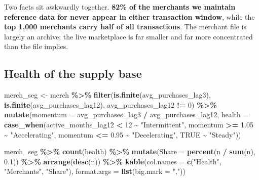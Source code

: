 \documentclass[
]{article}
\newenvironment{Shaded}{\begin{snugshade}}{\end{snugshade}}
\newcommand{\AttributeTok}[1]{\textcolor[rgb]{0.13,0.29,0.53}{#1}}
\newcommand{\ConstantTok}[1]{\textcolor[rgb]{0.56,0.35,0.01}{#1}}
\newcommand{\DecValTok}[1]{\textcolor[rgb]{0.00,0.00,0.81}{#1}}
\newcommand{\FloatTok}[1]{\textcolor[rgb]{0.00,0.00,0.81}{#1}}
\newcommand{\FunctionTok}[1]{\textcolor[rgb]{0.13,0.29,0.53}{\textbf{#1}}}
\newcommand{\NormalTok}[1]{#1}
\newcommand{\OtherTok}[1]{\textcolor[rgb]{0.56,0.35,0.01}{#1}}
\newcommand{\SpecialCharTok}[1]{\textcolor[rgb]{0.81,0.36,0.00}{\textbf{#1}}}
\newcommand{\StringTok}[1]{\textcolor[rgb]{0.31,0.60,0.02}{#1}}
\begin{document}
Two facts sit awkwardly together. \textbf{82\% of the merchants we
maintain reference data for never appear in either transaction window},
while the \textbf{top 1,000 merchants carry half of all transactions}.
The merchant file is largely an archive; the live marketplace is far
smaller and far more concentrated than the file implies.

\subsection{Health of the supply base}\label{health-of-the-supply-base}

\begin{Shaded}
\begin{Highlighting}[]
\NormalTok{merch\_seg }\OtherTok{\textless{}{-}}\NormalTok{ merch }\SpecialCharTok{\%\textgreater{}\%}
  \FunctionTok{filter}\NormalTok{(}\FunctionTok{is.finite}\NormalTok{(avg\_purchases\_lag3), }\FunctionTok{is.finite}\NormalTok{(avg\_purchases\_lag12),}
\NormalTok{         avg\_purchases\_lag12 }\SpecialCharTok{!=} \DecValTok{0}\NormalTok{) }\SpecialCharTok{\%\textgreater{}\%}
  \FunctionTok{mutate}\NormalTok{(}\AttributeTok{momentum =}\NormalTok{ avg\_purchases\_lag3 }\SpecialCharTok{/}\NormalTok{ avg\_purchases\_lag12,}
         \AttributeTok{health =} \FunctionTok{case\_when}\NormalTok{(active\_months\_lag12 }\SpecialCharTok{\textless{}} \DecValTok{12} \SpecialCharTok{\textasciitilde{}} \StringTok{"Intermittent"}\NormalTok{,}
\NormalTok{                            momentum }\SpecialCharTok{\textgreater{}=} \FloatTok{1.05} \SpecialCharTok{\textasciitilde{}} \StringTok{"Accelerating"}\NormalTok{,}
\NormalTok{                            momentum }\SpecialCharTok{\textless{}=} \FloatTok{0.95} \SpecialCharTok{\textasciitilde{}} \StringTok{"Decelerating"}\NormalTok{,}
                            \ConstantTok{TRUE} \SpecialCharTok{\textasciitilde{}} \StringTok{"Steady"}\NormalTok{))}

\NormalTok{merch\_seg }\SpecialCharTok{\%\textgreater{}\%} \FunctionTok{count}\NormalTok{(health) }\SpecialCharTok{\%\textgreater{}\%} \FunctionTok{mutate}\NormalTok{(}\AttributeTok{Share =} \FunctionTok{percent}\NormalTok{(n }\SpecialCharTok{/} \FunctionTok{sum}\NormalTok{(n), }\FloatTok{0.1}\NormalTok{)) }\SpecialCharTok{\%\textgreater{}\%}
  \FunctionTok{arrange}\NormalTok{(}\FunctionTok{desc}\NormalTok{(n)) }\SpecialCharTok{\%\textgreater{}\%} \FunctionTok{kable}\NormalTok{(}\AttributeTok{col.names =} \FunctionTok{c}\NormalTok{(}\StringTok{"Health"}\NormalTok{, }\StringTok{"Merchants"}\NormalTok{, }\StringTok{"Share"}\NormalTok{),}
                             \AttributeTok{format.args =} \FunctionTok{list}\NormalTok{(}\AttributeTok{big.mark =} \StringTok{","}\NormalTok{))}
\end{Highlighting}
\end{Shaded}
\end{document}
